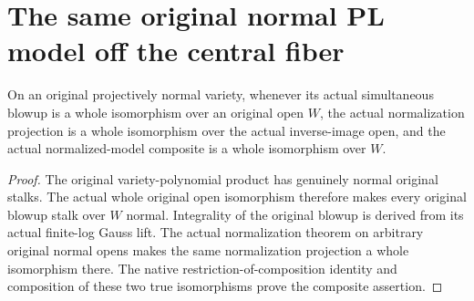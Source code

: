 \section{The same original normal PL model off the central fiber}

\begin{theorem}
\label{thm:actual-normalized-pl-model-open-isomorphism}
\leanok
{}
On an original projectively normal variety, whenever its actual simultaneous
blowup is a whole isomorphism over an original open $W$, the actual
normalization projection is a whole isomorphism over the actual inverse-image
open, and the actual normalized-model composite is a whole isomorphism over $W$.
\end{theorem}
\begin{proof}
The original variety-polynomial product has genuinely normal original stalks.
The actual whole original open isomorphism therefore makes every original
blowup stalk over $W$ normal. Integrality of the original blowup is derived
from its actual finite-log Gauss lift. The actual normalization theorem on
arbitrary original normal opens makes the same normalization projection a
whole isomorphism there. The native restriction-of-composition identity and
composition of these two true isomorphisms prove the composite assertion.
\end{proof}


